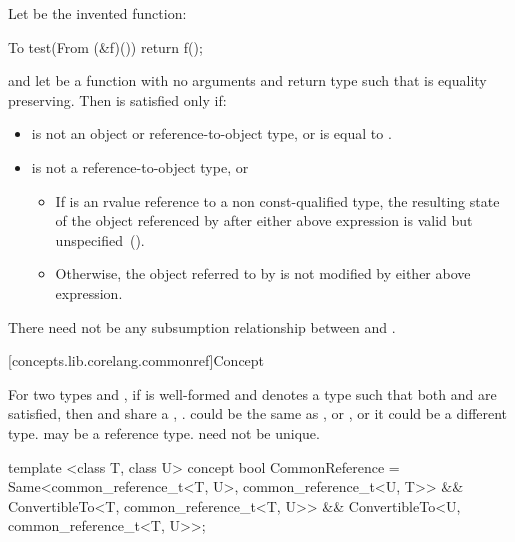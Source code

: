 \begin{itemdescr}
\pnum
Let  be the invented function:
\begin{codeblock}
To test(From (&f)()) {
  return f();
}
\end{codeblock}
and let  be a function with no arguments and return type 
such that  is equality preserving. Then
 is satisfied only if:

\begin{itemize}
\item
{} is not an object or reference-to-object type, or
 is equal to .

\item
{} is not a reference-to-object type, or

\begin{itemize}
\item
If  is an rvalue reference to a non const-qualified type, the resulting state of the object referenced by  after either above expression is valid but unspecified~().

\item
Otherwise, the object referred to by  is not modified by either above expression.
\end{itemize}

\end{itemize}

\pnum
There need not be any subsumption relationship between 
and .
\end{itemdescr}


[concepts.lib.corelang.commonref]{Concept }

\pnum
For two types  and , if 
is well-formed and denotes a type  such that both
 and  are
satisfied, then  and  share a , . \enternote {} could be the same as , or
, or it could be a different type.  may be a reference
type.  need not be unique.\exitnote

%
\begin{itemdecl}
template <class T, class U>
concept bool CommonReference =
  Same<common_reference_t<T, U>, common_reference_t<U, T>> &&
  ConvertibleTo<T, common_reference_t<T, U>> &&
  ConvertibleTo<U, common_reference_t<T, U>>;
\end{itemdecl}

